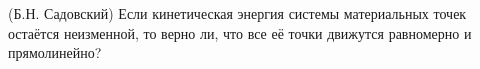 (Б.Н. Садовский)
Если кинетическая энергия системы материальных точек остаётся неизменной,
то верно ли, что все её точки движутся равномерно и прямолинейно?

